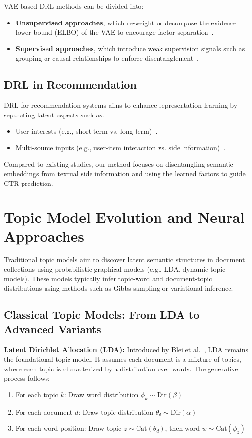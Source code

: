 VAE-based DRL methods can be divided into:
\begin{itemize}
    \item \textbf{Unsupervised approaches}, which re-weight or decompose the evidence lower bound (ELBO) of the VAE to encourage factor separation~\cite{higgins2017beta, burgess2018understanding}.
    \item \textbf{Supervised approaches}, which introduce weak supervision signals such as grouping or causal relationships to enforce disentanglement~\cite{yang2021causalvae}.
\end{itemize}

\subsection{DRL in Recommendation}

DRL for recommendation systems aims to enhance representation learning by separating latent aspects such as:
\begin{itemize}
    \item User interests (e.g., short-term vs. long-term)~\cite{ma2019learning, ma2020disentangled}.
    \item Multi-source inputs (e.g., user-item interaction vs. side information)~\cite{wang2020disentangled}.
\end{itemize}

Compared to existing studies, our method focuses on disentangling semantic embeddings from textual side information and using the learned factors to guide CTR prediction.

\section{Topic Model Evolution and Neural Approaches}

Traditional topic models aim to discover latent semantic structures in document collections using probabilistic graphical models (e.g., LDA, dynamic topic models). These models typically infer topic-word and document-topic distributions using methods such as Gibbs sampling or variational inference.

\subsection{Classical Topic Models: From LDA to Advanced Variants}

\textbf{Latent Dirichlet Allocation (LDA):} Introduced by Blei et al.~\cite{blei2003latent}, LDA remains the foundational topic model. It assumes each document is a mixture of topics, where each topic is characterized by a distribution over words. The generative process follows:
\begin{enumerate}
    \item For each topic $k$: Draw word distribution $\phi_k \sim \text{Dir}(\beta)$
    \item For each document $d$: Draw topic distribution $\theta_d \sim \text{Dir}(\alpha)$
    \item For each word position: Draw topic $z \sim \text{Cat}(\theta_d)$, then word $w \sim \text{Cat}(\phi_z)$
\end{enumerate}

